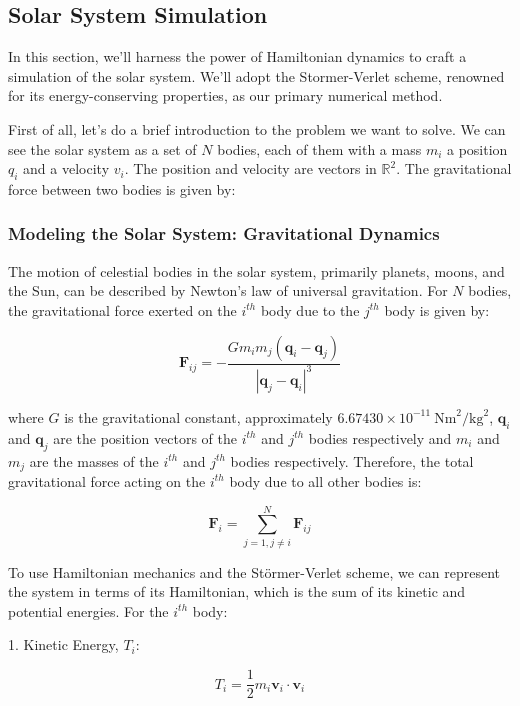 \documentclass{article}
\begin{document}
\subsection{Solar System Simulation}
\label{sec:solar_system_simulation}

In this section, we'll harness the power of Hamiltonian dynamics to craft a simulation of the solar system. We'll adopt the Stormer-Verlet scheme, renowned for its energy-conserving properties, as our primary numerical method.

First of all, let's do a brief introduction to the problem we want to solve. We can see the solar system as a set of \(N\) bodies, each of them with a mass \(m_i\) a position \(q_i\) and a velocity \(v_i\). The position and velocity are vectors in \(\mathbb{R}^2\). The gravitational force between two bodies is given by:

\subsubsection{Modeling the Solar System: Gravitational Dynamics}
\label{sec:modeling_solar_system}

The motion of celestial bodies in the solar system, primarily planets, moons, and the Sun, can be described by Newton's law of universal gravitation. For \(N\) bodies, the gravitational force exerted on the \(i^{th}\) body due to the \(j^{th}\) body is given by:

\[
\mathbf{F}_{ij} = -\frac{G m_i m_j (\mathbf{q}_i - \mathbf{q}_j)}{|\mathbf{q}_j - \mathbf{q}_i|^3}
\]

where \(G\) is the gravitational constant, approximately \(6.67430 \times 10^{-11} \ \text{Nm}^2/\text{kg}^2\), \(\mathbf{q}_i\) and \(\mathbf{q}_j\) are the position vectors of the \(i^{th}\) and \(j^{th}\) bodies respectively and \(m_i\) and \(m_j\) are the masses of the \(i^{th}\) and \(j^{th}\) bodies respectively. Therefore, the total gravitational force acting on the \(i^{th}\) body due to all other bodies is:

\[
	\mathbf{F}_i = \sum_{j=1, j\neq i}^{N} \mathbf{F}_{ij}
\]

To use Hamiltonian mechanics and the Störmer-Verlet scheme, we can represent the system in terms of its Hamiltonian, which is the sum of its kinetic and potential energies. For the \(i^{th}\) body:

1. Kinetic Energy, \(T_i\):

\[
	T_i = \frac{1}{2} m_i \mathbf{v}_i \cdot \mathbf{v}_i
\]
\end{document}
